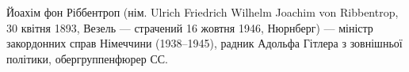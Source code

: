  
 
 
 
 

Йоахім фон Ріббентроп (нім. Ulrich Friedrich Wilhelm Joachim von Ribbentrop, 30
квітня 1893, Везель — страчений 16 жовтня 1946, Нюрнберг) — міністр закордонних
справ Німеччини (1938–1945), радник Адольфа Гітлера з зовнішньої політики,
обергруппенфюрер СС.
